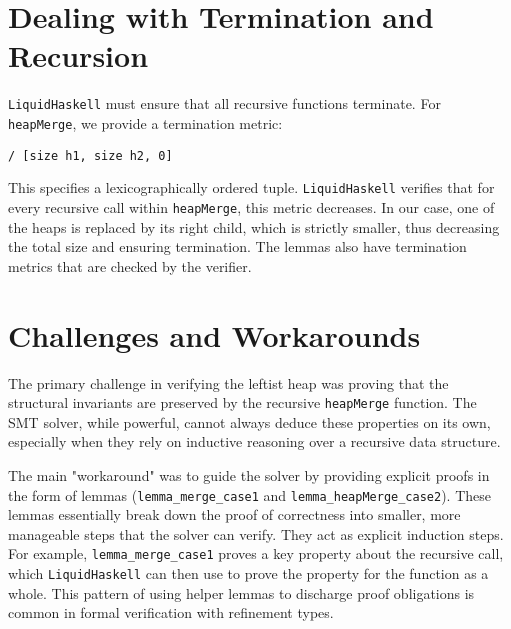 \section{Dealing with Termination and Recursion}
\texttt{LiquidHaskell} must ensure that all recursive functions terminate. For \texttt{heapMerge}, we provide a termination metric:
\begin{verbatim}
/ [size h1, size h2, 0]
\end{verbatim}
This specifies a lexicographically ordered tuple. \texttt{LiquidHaskell} verifies that for every recursive call within \texttt{heapMerge}, this metric decreases. In our case, one of the heaps is replaced by its right child, which is strictly smaller, thus decreasing the total size and ensuring termination. The lemmas also have termination metrics that are checked by the verifier.

\section{Challenges and Workarounds}
The primary challenge in verifying the leftist heap was proving that the structural invariants are preserved by the recursive \texttt{heapMerge} function. The SMT solver, while powerful, cannot always deduce these properties on its own, especially when they rely on inductive reasoning over a recursive data structure.

The main "workaround" was to guide the solver by providing explicit proofs in the form of lemmas (\texttt{lemma\_merge\_case1} and \texttt{lemma\_heapMerge\_case2}). These lemmas essentially break down the proof of correctness into smaller, more manageable steps that the solver can verify. They act as explicit induction steps. For example, \texttt{lemma\_merge\_case1} proves a key property about the recursive call, which \texttt{LiquidHaskell} can then use to prove the property for the function as a whole. This pattern of using helper lemmas to discharge proof obligations is common in formal verification with refinement types.

